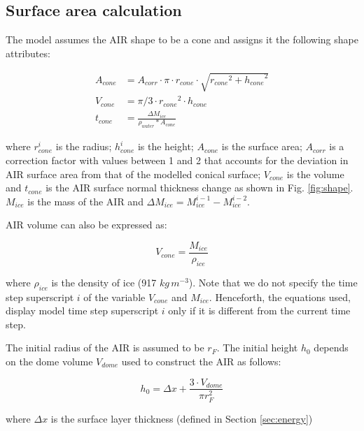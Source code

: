 \documentclass[utf8]{frontiersSCNS}
\begin{document}
\subsection{Surface area calculation}

The model assumes the AIR shape to be a cone and assigns it the following shape attributes:

\begin{subequations}
	\label{equations}
	\begin{align}
		\label{eq:A}
		A_{cone} & = A_{corr} \cdot \pi \cdot r_{cone} \cdot \sqrt{{r_{cone}}^2 + {h_{cone}}^ 2} \\
		\label{eq:V}
		V_{cone} & = \pi/3 \cdot {r_{cone}}^2 \cdot h_{cone}                                     \\
		\label{eq:thickness}
		t_{cone} & =\frac{\Delta M_{ice}}{\rho_{water}* A_{cone}}
	\end{align}
\end{subequations}

where $r_{cone}^i$ is the radius; $h_{cone}^i$ is the height; $A_{cone}$ is the surface area; $A_{corr}$ is a
correction factor with values between 1 and 2 that accounts for the deviation in AIR surface area from that of
the modelled conical surface; $V_{cone}$ is the volume and $t_{cone}$ is the AIR surface normal thickness
change as shown in Fig. \ref{fig:shape}. $M_{ice}$ is the mass of the AIR and $\Delta M_{ice} = M_{ice}^{i-1} -
	M_{ice}^{i-2}$.

AIR volume can also be expressed as:

\begin{equation} V_{cone} =\frac{M_{ice}} {\rho_{ice}} \label{eq:V1} \end{equation}

where $\rho_{ice}$ is the density of ice (917 $kg\, m^{-3}$). Note that we do not specify the time step
superscript $i$ of the variable  $V_{cone}$ and $M_{ice}$. Henceforth, the equations used, display model time
step superscript $i$ only if it is different from the current time step.

The initial radius of the AIR is assumed to be $r_F$. The initial height $h_0$ depends on the dome volume
$V_{dome}$ used to construct the AIR as follows:

\begin{equation}
	h_{0} =  \Delta x + \frac{3 \cdot V_{dome}}{\pi r_F^2 }
	\label{eq:h0}
\end{equation}

where $\Delta x$ is the surface layer thickness (defined in Section \ref{sec:energy})
\end{document}
